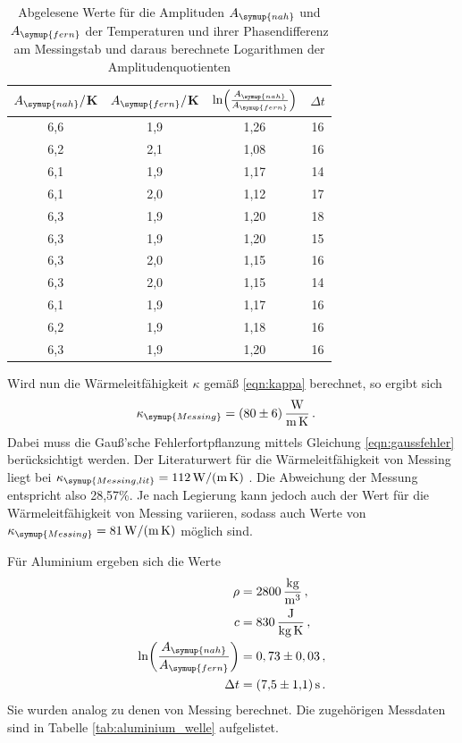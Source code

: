 \begin{table}
  \centering
  \caption{Abgelesene Werte für die Amplituden $A_{\symup{nah}}$ und $A_{\symup{fern}}$ der Temperaturen und
  ihrer Phasendifferenz am Messingstab und daraus berechnete Logarithmen der Amplitudenquotienten}
  \label{tab:messing_welle}
  \begin{tabular}{c c c c}
    \toprule
     $A_{\symup{nah}}/$K  & $A_{\symup{fern}}/$K & $\ln\Bigl(\frac{A_{\symup{nah}}}{A_{\symup{fern}}}\Bigr)$ & $\Delta t$ \\
    \midrule
    6,6 & 1,9 & 1,26  & 16  \\
    6,2 & 2,1 & 1,08  & 16  \\
    6,1 & 1,9 & 1,17  & 14  \\
    6,1 & 2,0 & 1,12  & 17  \\
    6,3 & 1,9 & 1,20  & 18  \\
    6,3 & 1,9 & 1,20  & 15  \\
    6,3 & 2,0 & 1,15  & 16  \\
    6,3 & 2,0 & 1,15  & 14  \\
    6,1 & 1,9 & 1,17  & 16  \\
    6,2 & 1,9 & 1,18  & 16  \\
    6,3 & 1,9 & 1,20  & 16  \\
    \bottomrule
  \end{tabular}
\end{table}

Wird nun die Wärmeleitfähigkeit $\kappa$ gemäß \eqref{eqn:kappa} berechnet, so ergibt sich
\begin{align}
  \kappa_{\symup{Messing}} &= \SI{80(6)}{\watt\per\meter\per\kelvin}\,.\nonumber
\end{align}
Dabei muss die Gauß'sche Fehlerfortpflanzung mittels Gleichung \eqref{eqn:gaussfehler}
berücksichtigt werden.
Der Literaturwert für die Wärmeleitfähigkeit von Messing liegt bei
$\kappa_{\symup{Messing,lit}}=\SI{112}{\watt\per\meter\per\kelvin}$ \cite{Wärmeleitfähigkeit1}.
Die Abweichung der Messung entspricht also 28,57\%. Je nach Legierung kann
jedoch auch der Wert für die Wärmeleitfähigkeit von Messing variieren, sodass auch Werte von
$\kappa_{\symup{Messing}} = \SI{81}{\watt\per\meter\per\kelvin}$ \cite{Wärmeleitfähigkeit2}
möglich sind.




Für Aluminium ergeben sich die Werte
\begin{align}
  \rho &= \SI{2800}{\kilo\gram\per\cubic\meter}\,, \nonumber\\
  c &= \SI{830}{\joule\per\kilo\gram\per\kelvin}\,, \nonumber\\
  \ln\biggl(\frac{A_{\symup{nah}}}{A_{\symup{fern}}}\biggr) &= 0,73 \pm 0,03 \,, \nonumber\\
  \Delta t &= \SI{7.5(11)}{\second} \,.\nonumber
\end{align}
Sie wurden analog zu denen von Messing berechnet. Die zugehörigen Messdaten sind
in Tabelle \ref{tab:aluminium_welle} aufgelistet.

